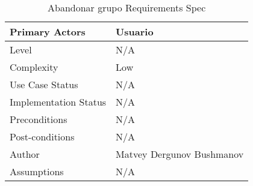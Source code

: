 \documentclass{book}
\begin{document}
\begin{table}[ht]
    \centering
    \begin{tabular}{|m{3cm}|m{10cm}|}
        \hline
        \rowcolor{blue!20} Primary Actors        & Usuario                   \\
        \hline
        Level                                    & N/A                       \\
        \hline
        \rowcolor{blue!20} Complexity            & Low                       \\
        \hline
        Use Case Status                          & N/A                       \\
        \hline
        \rowcolor{blue!20} Implementation Status & N/A                       \\
        \hline
        Preconditions                            & N/A                       \\
        \hline
        \rowcolor{blue!20} Post-conditions       & N/A                       \\
        \hline
        Author                                   & Matvey Dergunov Bushmanov \\
        \hline
        \rowcolor{blue!20} Assumptions           & N/A                       \\
        \hline
    \end{tabular}
    \caption{Abandonar grupo Requirements Spec}
\end{table}

\tableofcontents
\end{document}

